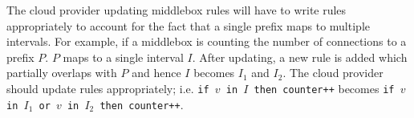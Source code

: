 The cloud provider updating middlebox rules will have to write rules appropriately to account for the fact that a 
single prefix maps to multiple intervals. For example, if a middlebox is counting the number of connections to a 
prefix $P$. $P$ maps to a single interval $I$. After updating, a new rule is added which partially overlaps 
with $P$ and hence $I$ becomes $I_1$ and $I_2$. The cloud provider should update rules appropriately; i.e. 
\texttt{if $v$ in $I$ then counter++} becomes \texttt{if $v$ in $I_1$ or $v$ in $I_2$ then counter++}.







